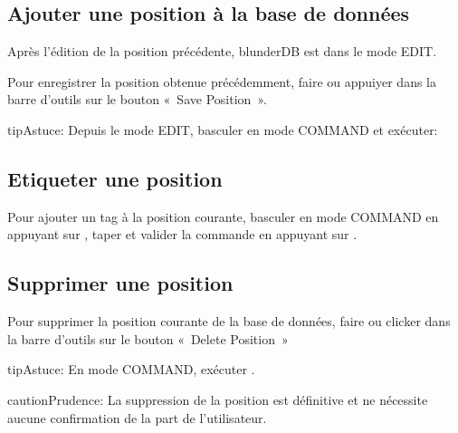 \documentclass[letterpaper,10pt,french]{sphinxmanual}
\begin{document}
\subsection{Ajouter une position à la base de données}
\label{\detokenize{guide_utilisateur:ajouter-une-position-a-la-base-de-donnees}}
\sphinxAtStartPar
Après l’édition de la position précédente, blunderDB est dans le mode EDIT.

\sphinxAtStartPar
Pour enregistrer la position obtenue précédemment, faire  ou appuiyer
dans la barre d’outils sur le bouton « Save Position ».

\begin{sphinxadmonition}{tip}{Astuce:}
\sphinxAtStartPar
Depuis le mode EDIT, basculer en mode COMMAND et exécuter: 
\end{sphinxadmonition}


\subsection{Etiqueter une position}
\label{\detokenize{guide_utilisateur:etiqueter-une-position}}
\sphinxAtStartPar
Pour ajouter un tag  à la position courante, basculer en mode COMMAND en appuyant sur ,
taper  et valider la commande en appuyant sur .


\subsection{Supprimer une position}
\label{\detokenize{guide_utilisateur:supprimer-une-position}}
\sphinxAtStartPar
Pour supprimer la position courante de la base de données, faire  ou
clicker dans la barre d’outils sur le bouton « Delete Position »

\begin{sphinxadmonition}{tip}{Astuce:}
\sphinxAtStartPar
En mode COMMAND, exécuter .
\end{sphinxadmonition}

\begin{sphinxadmonition}{caution}{Prudence:}
\sphinxAtStartPar
La suppression de la position est définitive et ne nécessite
aucune confirmation de la part de l’utilisateur.
\end{sphinxadmonition}
\end{document}
